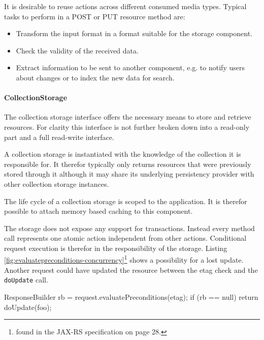 \documentclass[12pt,a4paper]{scrartcl}		%
\begin{document}

It is desirable to reuse actions across different consumed media types. Typical
tasks to perform in a POST or PUT resource method are:
\begin{itemize}
\item Transform the input format in a format suitable for the storage component.
\item Check the validity of the received data.
\item Extract information to be sent to another component, e.g. to notify users
  about changes or to index the new data for search.
\end{itemize}

\paragraph{CollectionStorage}
\label{sec:collectionstorage}

The collection storage interface offers the necessary means to store and
retrieve resources. For clarity this interface is not further broken down into a
read-only part and a full read-write interface.

A collection storage is instantiated with the knowledge of the collection it is
responsible for. It therefor typically only returns resources that were
previously stored through it although it may share its underlying persistency
provider with other collection storage instances.

The life cycle of a collection storage is scoped to the application. It is
therefor possible to attach memory based caching to this component.

The storage does not expose any support for transactions. Instead every method
call represents one atomic action independent from other actions. Conditional
request execution is therefor in the responsibility of the storage. Listing
\ref{fig:evaluatepreconditions-concurrency}\footnote{found in the JAX-RS
  specification on page 28.} shows a possibility for a lost update. Another
request could have updated the resource between the etag check and the
\lstinline:doUpdate: call.

\begin{javalisting}[label=fig:evaluatepreconditions-concurrency,
                   caption={Potential lost-update problem with JAX-RS}]
ResponseBuilder rb = request.evaluatePreconditions(etag);
if (rb == null)
  return doUpdate(foo);
\end{javalisting}
\end{document}
